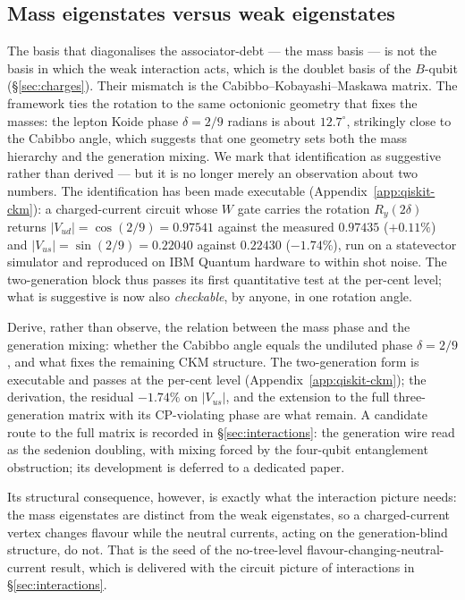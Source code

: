 \subsection{Mass eigenstates versus weak eigenstates}

The basis that diagonalises the associator-debt --- the mass basis --- is not the basis in which the
weak interaction acts, which is the doublet basis of the $B$-qubit (\S\ref{sec:charges}). Their
mismatch is the Cabibbo--Kobayashi--Maskawa matrix. The framework ties the rotation to the same
octonionic geometry that fixes the masses: the lepton Koide phase $\delta = 2/9$ radians is about
$12.7^\circ$, strikingly close to the Cabibbo angle, which suggests that one geometry sets both the
mass hierarchy and the generation mixing. We mark that identification as suggestive rather than
derived --- but it is no longer merely an observation about two numbers. The identification has
been made executable (Appendix~\ref{app:qiskit-ckm}): a charged-current circuit whose $W$ gate
carries the rotation $R_y(2\delta)$ returns $\lvert V_{ud}\rvert = \cos(2/9) = 0.97541$ against
the measured $0.97435$ ($+0.11\%$) and $\lvert V_{us}\rvert = \sin(2/9) = 0.22040$ against
$0.22430$ ($-1.74\%$), run on a statevector simulator and reproduced on IBM Quantum hardware to
within shot noise. The two-generation block thus passes its first quantitative test at the
per-cent level; what is suggestive is now also \emph{checkable}, by anyone, in one rotation angle.

\begin{openproblem}\label{op:cabibbo}
Derive, rather than observe, the relation between the mass phase and the generation mixing: whether
the Cabibbo angle equals the undiluted phase $\delta = 2/9$, and what fixes the remaining CKM
structure. The two-generation form is executable and passes at the per-cent level
(Appendix~\ref{app:qiskit-ckm}); the derivation, the residual $-1.74\%$ on
$\lvert V_{us}\rvert$, and the extension to the full three-generation matrix with its
CP-violating phase are what remain. A candidate route to the full matrix is recorded in
\S\ref{sec:interactions}: the generation wire read as the sedenion doubling, with mixing forced
by the four-qubit entanglement obstruction; its development is deferred to a dedicated paper.
\end{openproblem}

Its structural consequence, however, is exactly what the interaction picture needs: the mass
eigenstates are distinct from the weak eigenstates, so a charged-current vertex changes flavour while
the neutral currents, acting on the generation-blind structure, do not. That is the seed of the
no-tree-level flavour-changing-neutral-current result, which is delivered with the circuit picture of
interactions in \S\ref{sec:interactions}.

